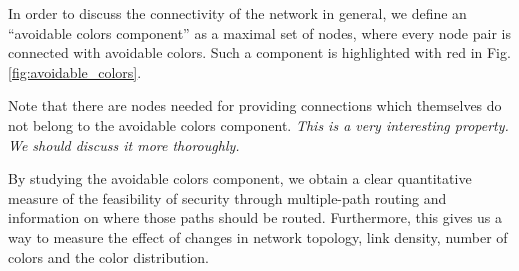 \documentclass[aps, pre, twocolumn, a4paper, superscriptaddress, floatfix]{revtex4}
\newcommand{\red}{\color{red}\footnotesize}
\begin{document}
In order to discuss the connectivity of the network in general, 
we define an ``avoidable colors component'' as a maximal set of nodes, 
where every node pair is connected with avoidable colors. 
Such a component is highlighted with red in Fig. \ref{fig:avoidable_colors}. 

{\red 
Note that there are nodes needed for providing 
connections which themselves do not belong to the avoidable colors component. 
\textit{This is a very interesting property. We should discuss it more thoroughly.}}

By studying the avoidable colors component, we obtain a clear quantitative measure of the feasibility of security through multiple-path routing and information on where those paths should be routed.
Furthermore, this gives us a way to measure the effect of changes in network topology, link density, number of colors and the color distribution.

\end{document}
